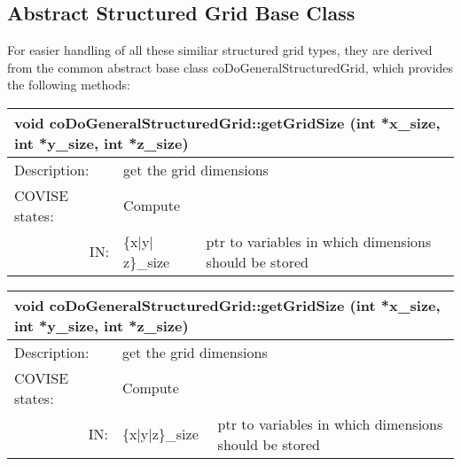\subsection{Abstract Structured Grid Base Class}

For easier handling of all these similiar structured grid types, they are
derived from the common abstract base class coDoGeneralStructuredGrid,
which provides the following methods:

\latexonly
\begin{longtable}{|p{4cm}|p{2.5cm}|p{7cm}|}
\hline
\multicolumn{3}{|p{13.5cm}|}{\bf void coDoGeneralStructuredGrid::getGridSize \newline
           (int *x\_size, int *y\_size, int *z\_size)}\\
\hline
{Description:}  
           & \multicolumn{2}{p{9.5cm}|}{get the grid dimensions} \\
\hline
{COVISE states:}  
           & \multicolumn{2}{p{9.5cm}|}{Compute} \\
\hline
\multicolumn{1}{|r|}{IN:} & \multicolumn{1}{p{3cm}|}{\{x$\mid$y$\mid$z\}\_size} 
                          & \multicolumn{1}{p{5cm}|}{ptr to variables in which 
			  dimensions should be stored}\endhead
\hline
\end{longtable}
\endlatexonly

\begin{htmlonly}
\begin{longtable}{|p{4cm}|p{2.5cm}|p{7cm}|}
\hline
\multicolumn{3}{|p{13.5cm}|}{\bf void coDoGeneralStructuredGrid::getGridSize \newline
           (int *x\_size, int *y\_size, int *z\_size)}\\
\hline
{Description:}  
           & \multicolumn{2}{p{9.5cm}|}{get the grid dimensions} \\
\hline
{COVISE states:}  
           & \multicolumn{2}{p{9.5cm}|}{Compute} \\
\hline
\multicolumn{1}{|r|}{IN:} & \multicolumn{1}{p{3cm}|}{\{x|y|z\}\_size} 
                          & \multicolumn{1}{p{5cm}|}{ptr to variables in which 
			  dimensions should be stored}\endhead
\hline
\end{longtable}
\end{htmlonly}


